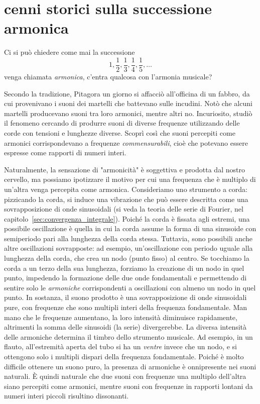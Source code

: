 \section{cenni storici sulla successione armonica}


Ci si può chiedere come mai la successione
\[
 1, \frac 1 2, \frac 1 3, \frac 1 4, \frac 1 5, \dots
\]
venga chiamata \emph{armonica}, c'entra qualcosa con l'armonia musicale?

Secondo la tradizione, Pitagora un giorno si affacciò all'officina di un fabbro, 
da cui provenivano i suoni dei martelli che battevano sulle incudini. 
Notò che alcuni martelli producevano suoni tra loro armonici, mentre altri no. 
Incuriosito, studiò il fenomeno cercando di produrre suoni di diverse frequenze 
utilizzando delle corde con tensioni e lunghezze diverse. 
Scoprì così che suoni percepiti come armonici corrispondevano a frequenze 
\emph{commensurabili}, cioè che potevano essere espresse come rapporti di numeri interi.


Naturalmente, la sensazione di "armonicità" è soggettiva e prodotta dal nostro cervello, 
ma possiamo ipotizzare il motivo per cui una frequenza che è multiplo di un'altra venga percepita come armonica.
Consideriamo uno strumento a corda: pizzicando la corda, si induce 
una vibrazione che può essere descritta come una sovrapposizione di 
onde sinusoidali (si veda la teoria delle serie di Fourier, 
nel capitolo~\ref{sec:convergenza_integrale}). 
Poiché la corda è fissata agli estremi, una possibile oscillazione è quella 
in cui la corda assume la forma di una sinusoide 
con semiperiodo pari alla lunghezza della corda stessa. 
Tuttavia, sono possibili anche altre oscillazioni sovrapposte: 
ad esempio, un'oscillazione con periodo uguale alla lunghezza 
della corda, che crea un nodo (punto fisso) al centro. 
Se tocchiamo la corda a un terzo della sua lunghezza, forziamo 
la creazione di un nodo in quel punto, impedendo la formazione 
delle due onde fondamentali e permettendo di sentire solo le 
\emph{armoniche} corrispondenti a oscillazioni con almeno 
un nodo in quel punto.
In sostanza, il suono prodotto è una sovrapposizione di onde sinusoidali pure, 
con frequenze che sono multipli interi della frequenza fondamentale. 
Man mano che le frequenze aumentano, la loro intensità diminuisce rapidamente, 
altrimenti la somma delle sinusoidi (la serie) divergerebbe. 
La diversa intensità delle armoniche determina il timbro dello strumento musicale. 
Ad esempio, in un flauto, all'estremità aperta del tubo si ha un \emph{ventre} 
invece che un nodo, e si ottengono solo i multipli dispari della frequenza fondamentale.
Poiché è molto difficile ottenere un suono puro, la presenza di armoniche 
è onnipresente nei suoni naturali. 
È quindi naturale che due suoni con frequenze una multiplo dell'altra 
siano percepiti come armonici, mentre suoni con frequenze in rapporti 
lontani da numeri interi piccoli risultino dissonanti.


